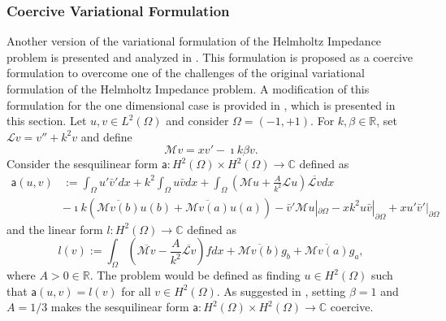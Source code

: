 \subsubsection{Coercive Variational Formulation}\label{sec:coerciveformulation}
Another version of the variational formulation of the Helmholtz Impedance problem is presented and analyzed in \cite{moiola2014}. This formulation is proposed as a coercive formulation to overcome one of the challenges of the original variational formulation of the Helmholtz Impedance problem. A modification of this formulation for the one dimensional case is provided in \cite{henriquez2022}, which is presented in this section. Let $u, v \in L^2(\Omega)$ and consider $\Omega=(-1,+1)$. For $k, \beta \in \mathbb{R}$, set $\mathcal{L}v= v''+k^2v$ and define
\begin{equation}
    \mathcal{M}v=xv'-\imath k \beta v.
\end{equation}
Consider the sesquilinear form $\mathsf{a}: H^2(\Omega)\times H^2(\Omega) \to \mathbb{C}$ defined as
\begin{equation}
    \label{eq:coercivelhs}
    \begin{split}
        \mathsf{a}(u, v) & := \int_{\Omega}{u'\bar{v}'dx} + k^2 \int_{\Omega}{u\bar{v}dx} + \int_{\Omega} \left ( \mathcal{M}u + \frac{A}{k^2}\mathcal{L}u\right )\overline{\mathcal{L}v}dx \\ & - \imath k (\overline{\mathcal{M}v(b)}u(b) + \overline{\mathcal{M}v(a)}u(a)) - \bar{v}'\mathcal{M}u|_{\partial \Omega} - xk^2u\bar{v}|_{\partial \Omega} + xu'\bar{v}'|_{\partial \Omega}
    \end{split}
\end{equation}
and the linear form $l: H^2(\Omega) \to \mathbb{C}$ defined as
\begin{equation}
    \label{eq:coerciverhs}
    l(v) := \int_{\Omega}{\left ( \overline{\mathcal{M}v} - \frac{A}{k^2} \overline{\mathcal{L}v} \right )fdx + \overline{\mathcal{M}v(b)}g_b + \overline{\mathcal{M}v(a)}g_a},
\end{equation}
where $A>0 \in \mathbb{R}$. The problem would be defined as finding $u \in H^2(\Omega)$ such that $\mathsf{a}(u,v)=l(v)$ for all $v \in H^2(\Omega)$. As suggested in \cite{henriquez2022}, setting $\beta = 1$ and $A = 1/3$ makes the sesquilinear form $\mathsf{a}: H^2(\Omega) \times H^2(\Omega) \to \mathbb{C}$ coercive.

